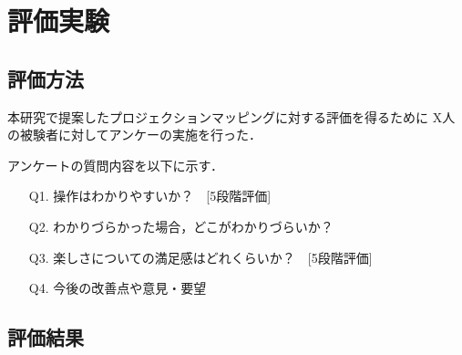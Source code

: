 \chapter{評価実験}
\thispagestyle{fancy}


\section{評価方法}
本研究で提案したプロジェクションマッピングに対する評価を得るために
X人の被験者に対してアンケーの実施を行った．

アンケートの質問内容を以下に示す．
\begin{itemize}
  \item[Q1.] 操作はわかりやすいか？　[5段階評価]
  \item[Q2.] わかりづらかった場合，どこがわかりづらいか？ 
  \item[Q3.] 楽しさについての満足感はどれくらいか？　[5段階評価]
  \item[Q4.] 今後の改善点や意見・要望   
\end{itemize}



\section{評価結果}


